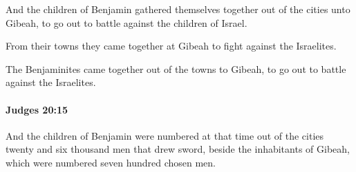 			\begin{versebox}
					\item[BHS] 
					\item[ASV] And the children of Benjamin gathered themselves together out of the cities unto Gibeah, to go out to battle against the children of Israel.
					\item[NIV] From their towns they came together at Gibeah to fight against the Israelites.
					\item[NRSV] The Benjaminites came together out of the towns to Gibeah, to go out to battle against the Israelites.
			\end{versebox}

		\paragraph{Judges 20:15} %
			\label{JUDGES-20-15}

			And the children of Benjamin were numbered at that time out of the cities twenty and six thousand men that drew sword, beside the inhabitants of Gibeah, which were numbered seven hundred chosen men.

